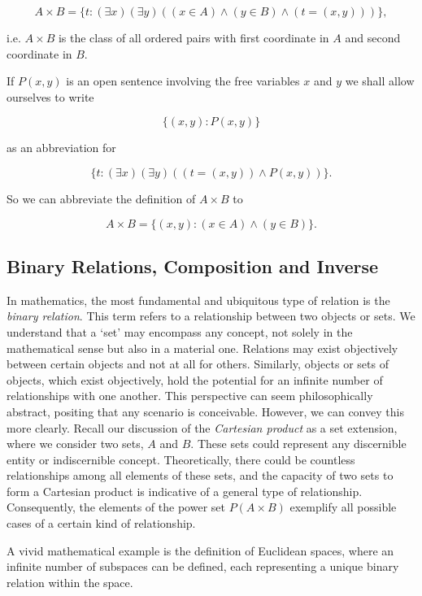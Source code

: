         $$
        A\times B=\{t:(\exists x)(\exists y)((x\in A)\land(y\in B)\land(t=(x,y)))\},
        $$

        i.e. $A\times B$ is the class of all ordered pairs with first coordinate in $A$ and second coordinate in $B.$

        If $P(x,y)$ is an open sentence involving the free variables $x$ and $y$ we shall allow ourselves to write

        $$
        \{(x,y):P(x,y)\}
        $$

        as an abbreviation for

        $$
        \{t:(\exists x)(\exists y)((t=(x,y))\land P(x,y))\}.
        $$

        So we can abbreviate the definition of $A\times B$ to

        $$
        A\times B=\{(x,y):(x\in A)\wedge(y\in B)\}.
        $$


\subsection{Binary Relations, Composition and Inverse}
In mathematics, the most fundamental and ubiquitous type of relation is the \emph{binary relation}. This term refers to a relationship between two objects or sets. We understand that a `set' may encompass any concept, not solely in the mathematical sense but also in a material one. Relations may exist objectively between certain objects and not at all for others. Similarly, objects or sets of objects, which exist objectively, hold the potential for an infinite number of relationships with one another. This perspective can seem philosophically abstract, positing that any scenario is conceivable. However, we can convey this more clearly. Recall our discussion of the \emph{Cartesian product} as a set extension, where we consider two sets, \( A \) and \( B \). These sets could represent any discernible entity or indiscernible concept. Theoretically, there could be countless relationships among all elements of these sets, and the capacity of two sets to form a Cartesian product is indicative of a general type of relationship. Consequently, the elements of the power set \( P(A \times B) \) exemplify all possible cases of a certain kind of relationship.

A vivid mathematical example is the definition of Euclidean spaces, where an infinite number of subspaces can be defined, each representing a unique binary relation within the space.

